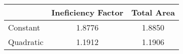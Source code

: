 \begin{tabular}{lcc}
\toprule
{} &  Ineficiency Factor &  Total Area \\
\midrule
Constant  &                1.8776 &       1.8850 \\
Quadratic &                1.1912 &       1.1906 \\
\bottomrule
\end{tabular}
